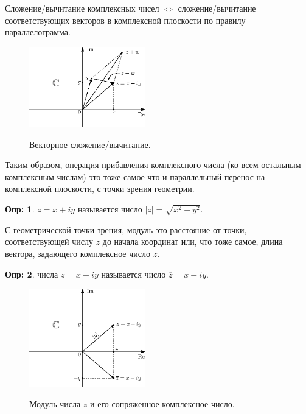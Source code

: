 \documentclass[12pt]{article}
\theoremstyle{definition}
\newtheorem{defn}{Опр:}
\newcommand{\ovl}[1]{\overline{#1}}
\begin{document}
Сложение/вычитание комплексных чисел $\Leftrightarrow$ сложение/вычитание соответствующих векторов в комплексной плоскости по правилу параллелограмма.
\begin{figure}[H]
	\centering
	\includegraphics[width=0.45\textwidth]{AL1L13_2.eps}
	\label{AL1L13_2}
	\caption{Векторное сложение/вычитание.}
\end{figure}

Таким образом, операция прибавления комплексного числа (ко всем остальным комплексным числам) это тоже самое что и параллельный перенос на комплексной плоскости, с точки зрения геометрии. 

\begin{defn}
	 $z = x + iy$ называется число $|z| = \sqrt{x^2 + y^2}$.
\end{defn}

С геометрической точки зрения, модуль это расстояние от точки, соответствующей числу $z$ до начала координат или, что тоже самое, длина вектора, задающего комплексное число $z$.


\begin{defn}
	 числа $z = x + iy$ называется число $\ovl{z} = x - iy$.
\end{defn}

\begin{figure}[H]
	\centering
	\includegraphics[width=0.45\textwidth]{AL1L13_3.eps}
	\label{AL1L13_3}
	\caption{Модуль числа $z$ и его сопряженное комплексное число.}
\end{figure}
\end{document}

